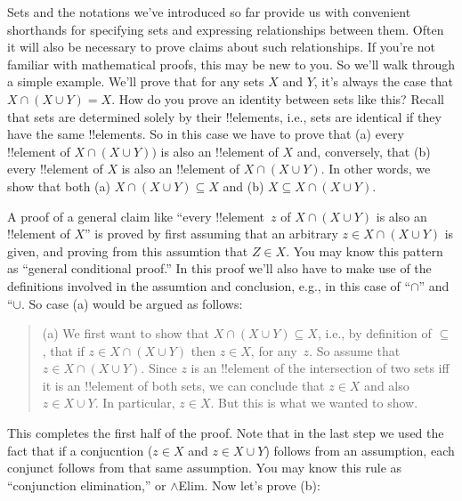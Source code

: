 \documentclass[../../include/open-logic-section]{subfiles}
\begin{document}

\begin{explain}
Sets and the notations we've introduced so far provide us with
convenient shorthands for specifying sets and expressing relationships
between them. Often it will also be necessary to prove claims about
such relationships.  If you're not familiar with mathematical proofs,
this may be new to you. So we'll walk through a simple example.  We'll
prove that for any sets $X$ and $Y$, it's always the case that $X \cap
(X \cup Y) = X$.  How do you prove an identity between sets like this?
Recall that sets are determined solely by their !!{element}s, i.e.,
sets are identical if they have the same !!{element}s.  So in this
case we have to prove that (a) every !!{element} of $X \cap (X \cup
Y))$ is also an !!{element} of $X$ and, conversely, that (b) every
!!{element} of $X$ is also an !!{element} of $X \cap (X \cup Y)$. In
other words, we show that both (a) $X \cap (X \cup Y) \subseteq X$ and
(b) $X \subseteq X \cap (X \cup Y)$.

A proof of a general claim like ``every !!{element}~$z$ of $X \cap (X
\cup Y)$ is also an !!{element} of $X$'' is proved by first assuming
that an arbitrary $z \in X \cap (X \cup Y)$ is given, and proving from
this assumtion that $Z \in X$. You may know this pattern as ``general
conditional proof.''  In this proof we'll also have to make use of the
definitions involved in the assumtion and conclusion, e.g., in this
case of ``$\cap$'' and ``$\cup$.  So case (a) would be argued as
follows:

\begin{quote}
(a) We first want to show that $X \cap (X \cup Y) \subseteq X$, i.e.,
by definition of $\subseteq$, that if $z \in X \cap (X \cup Y)$ then
$z \in X$, for any~$z$.  So assume that $z \in X \cap (X \cup
Y)$. Since $z$ is an !!{element} of the intersection of two sets iff
it is an !!{element} of both sets, we can conclude that $z \in X$ and
also $z \in X \cup Y$.  In particular, $z \in X$. But this is what
we wanted to show.
\end{quote}

This completes the first half of the proof.  Note that in the last
step we used the fact that if a conjucntion ($z \in X$ and $z \in X
\cup Y$) follows from an assumption, each conjunct follows from that
same assumption. You may know this rule as ``conjunction
elimination,'' or $\land$Elim. Now let's prove (b):


\end{explain}
\end{document}
